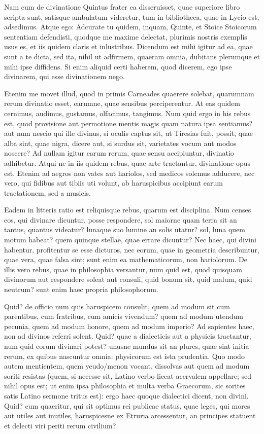  Nam cum de divinatione Quintus frater ea disseruisset, quae superiore libro scripta sunt, satisque ambulatum videretur, tum in bibliotheca, quae in Lycio est, adsedimus. Atque ego: Adcurate tu quidem, inquam, Quinte, et Stoice Stoicorum sententiam defendisti, quodque me maxime delectat, plurimis nostris exemplis usus es, et iis quidem claris et inlustribus. Dicendum est mihi igitur ad ea, quae sunt a te dicta, sed ita, nihil ut adfirmem, quaeram omnia, dubitans plerumque et mihi ipse diffidens. Si enim aliquid certi haberem, quod dicerem, ego ipse divinarem, qui esse divinationem nego.

 Etenim me movet illud, quod in primis Carneades quaerere solebat, quarumnam rerum divinatio esset, earumne, quae sensibus perciperentur. At eas quidem cernimus, audimus, gustamus, olfacimus, tangimus. Num quid ergo in his rebus est, quod provisione aut permotione mentis magis quam natura ipsa sentiamus? aut num nescio qui ille divinus, si oculis captus sit, ut Tiresias fuit, possit, quae alba sint, quae nigra, dicere aut, si surdus sit, varietates vocum aut modos noscere? Ad nullam igitur earum rerum, quae sensu accipiuntur, divinatio adhibetur. Atqui ne in iis quidem rebus, quae arte tractantur, divinatione opus est. Etenim ad aegros non vates aut hariolos, sed medicos solemus adducere, nec vero, qui fidibus aut tibiis uti volunt, ab haruspicibus accipiunt earum tractationem, sed a musicis.

 Eadem in litteris ratio est reliquisque rebus, quarum est disciplina. Num censes eos, qui divinare dicuntur, posse respondere, sol maiorne quam terra sit an tantus, quantus videatur? lunaque suo lumine an solis utatur? sol, luna quem motum habeat? quem quinque stellae, quae errare dicuntur? Nec haec, qui divini habentur, profitentur se esse dicturos, nec eorum, quae in geometria describuntur, quae vera, quae falsa sint; sunt enim ea mathematicorum, non hariolorum. De illis vero rebus, quae in philosophia versantur, num quid est, quod quisquam divinorum aut respondere soleat aut consuli, quid bonum sit, quid malum, quid neutrum? sunt enim haec propria philosophorum.

 Quid? de officio num quis haruspicem consulit, quem ad modum sit cum parentibus, cum fratribus, cum amicis vivendum? quem ad modum utendum pecunia, quem ad modum honore, quem ad modum imperio? Ad sapientes haec, non ad divinos referri solent. Quid? quae a dialecticis aut a physicis tractantur, num quid eorum divinari potest? unusne mundus sit an plures, quae sint initia rerum, ex quibus nascuntur omnia: physicorum est ista prudentia. Quo modo autem mentientem, quem yeudo/menon vocant, dissolvas aut quem ad modum soriti resistas (quem, si necesse sit, Latino verbo liceat acervalem appellare; sed nihil opus est; ut enim ipsa philosophia et multa verba Graecorum, sic sorites satis Latino sermone tritus est): ergo haec quoque dialectici dicent, non divini. Quid? cum quaeritur, qui sit optimus rei publicae status, quae leges, qui mores aut utiles aut inutiles, haruspicesne ex Etruria arcessentur, an principes statuent et delecti viri periti rerum civilium?

